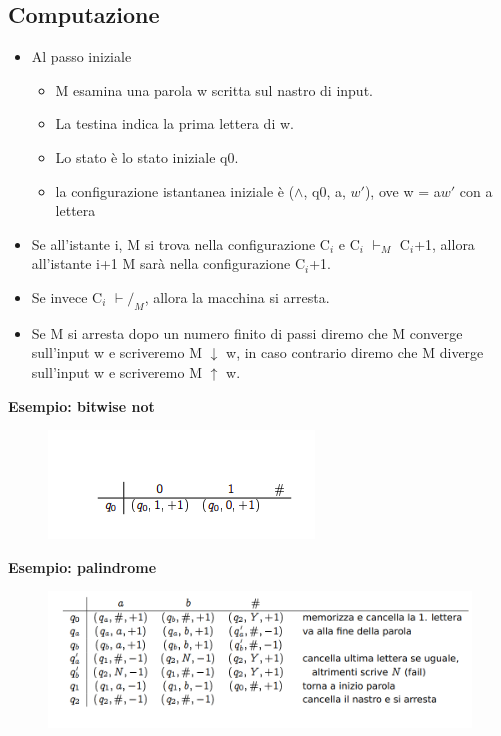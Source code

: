\subsection{Computazione}
\begin{itemize}
    \item Al passo iniziale 
    
    \begin{itemize}
    \item M esamina una parola w scritta sul nastro di input.
    
    \item La testina indica la prima lettera di w.
    
    \item Lo stato è lo stato iniziale q0.
    
    \item la configurazione istantanea iniziale è ($\wedge$, q0, a, $w'$), ove w = a$w'$ con a lettera
    \end{itemize}
\end{itemize}
\begin{itemize}
    \item Se all’istante i, M si trova nella configurazione C$_i$ e C$_i$  $\vdash_M$ C$_i$+1, allora all’istante i+1 M sarà nella configurazione C$_i$+1.
    
    \item Se invece C$_i$ $\vdash/_M$, allora la macchina si arresta.
    
    \item Se M si arresta dopo un numero finito di passi diremo che M converge sull’input w e scriveremo M $\downarrow$ w, in caso contrario diremo che M diverge sull’input w e scriveremo M $\uparrow$ w.
\end{itemize}
\newpage
\textbf{Esempio: bitwise not}
\begin{figure}[htp]
    \centering
     \includegraphics[scale=0.9]{tesi_stile/img/bit.png}
\end{figure}

\textbf{Esempio: palindrome}
\begin{figure}[htp]
    \centering
     \includegraphics[scale=0.6]{tesi_stile/img/pal.png}
\end{figure}
\newpage
